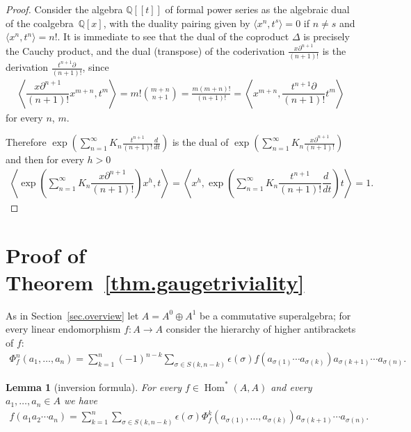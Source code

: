 \documentclass[pdftex]{sigma}
\newcommand{\Hom}{\operatorname{Hom}}
\newcommand{\Q}{\mathbb{Q}}
\numberwithin{equation}{section}
\newtheorem{Lemma}[Theorem]{Lemma}
 { \theoremstyle{definition}
\newtheorem{Definition}[Theorem]{Definition}
\newtheorem{Example}[Theorem]{Example}
\newtheorem{Remark}[Theorem]{Remark} }
\begin{document}
\begin{proof}Consider the algebra $\Q[[t]]$ of formal power series as the algebraic dual of the coalgebra~$\Q[x]$, with the duality pairing given by
$\langle x^n,t^s\rangle=0$ if $n\not=s$ and $\langle x^n,t^n\rangle=n!$.
It is immediate to see that the dual of the coproduct $\Delta$ is precisely the Cauchy product, and the dual (transpose) of the coderivation $\frac{x\partial^{n+1}}{(n+1)!}$ is the derivation
$\frac{t^{n+1}\partial}{(n+1)!}$, since
\begin{gather*} \left\langle \dfrac{x\partial^{n+1}}{(n+1)!}x^{m+n},t^{m}\right\rangle=
m!\binom{m+n}{n+1}=\frac{m(m+n)!}{(n+1)!}=
\left\langle x^{m+n},\dfrac{t^{n+1}\partial}{(n+1)!}t^{m}\right\rangle
\end{gather*}
for every $n$, $m$.

Therefore $\exp\left(\sum\limits_{n=1}^{\infty}K_n\frac{t^{n+1}}{ (n+1)! }\frac{d~}{dt}\right)$ is the dual of $\exp\left(\sum\limits_{n=1}^{\infty}K_n \frac{x\partial^{n+1}}{(n+1)!}
\right)$ and then for every $h>0$
\begin{gather*} \left\langle \exp\left(\sum_{n=1}^{\infty}K_n \dfrac{x\partial^{n+1}}{(n+1)!}
\right)x^h, t\right\rangle=
\left\langle x^h, \exp\left(\sum_{n=1}^{\infty}K_n\dfrac{t^{n+1}}{ (n+1)! }\dfrac{d~}{dt}\right)t\right\rangle=1.\tag*{\qed}\end{gather*}
\renewcommand{\qed}{}
\end{proof}

\section{Proof of Theorem~\ref{thm.gaugetriviality}}

As in Section~\ref{sec.overview} let $A=A^{0}\oplus A^{1}$ be a commutative superalgebra; for every linear endomorphism $f\colon A\to A$ consider the hierarchy of higher antibrackets of $f$:
\begin{gather*}\Phi^n_f(a_1,\ldots,a_n)=
\sum_{k=1}^n(-1)^{n-k}\sum_{\sigma\in S(k,n-k)}\epsilon(\sigma)
f(a_{\sigma(1)}\cdots a_{\sigma(k)})a_{\sigma(k+1)}\cdots a_{\sigma(n)} .\end{gather*}

\begin{Lemma}[inversion formula] For every $f\in \Hom^*(A,A)$ and every $a_1,\ldots,a_n\in A$ we have
\begin{gather*}
f(a_1a_2\cdots a_n)=\sum_{k=1}^n \sum_{\sigma\in S(k,n-k)}\epsilon(\sigma)
\Phi^k_f(a_{\sigma(1)},\ldots, a_{\sigma(k)})a_{\sigma(k+1)}\cdots a_{\sigma(n)} .
\end{gather*}
\end{Lemma}
\end{document}
